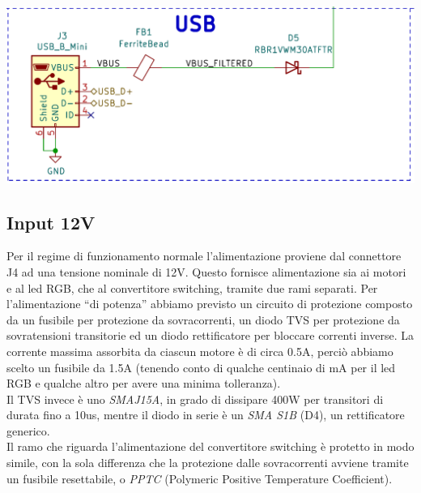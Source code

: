 \begin{center}
\includegraphics[scale=0.4]{figures/image60.png}
\captionsetup{type=figure}
\end{center}

\hypertarget{input-12V}{%
\subsection{\texorpdfstring{Input 12V}{Input 12V}}\label{input-12V}}

Per il regime di funzionamento normale l’alimentazione proviene dal connettore J4 ad una tensione nominale di 12V. 
Questo fornisce alimentazione sia ai motori e al led RGB, che al convertitore switching, tramite due rami separati.
Per l’alimentazione “di potenza” abbiamo previsto un circuito di protezione composto da un fusibile per protezione da sovracorrenti, 
un diodo TVS per protezione da sovratensioni transitorie ed un diodo rettificatore per bloccare correnti inverse. La corrente massima assorbita da 
ciascun motore è di circa 0.5A, perciò abbiamo scelto un fusibile da 1.5A (tenendo conto di qualche centinaio di mA per il led RGB 
e qualche altro per avere una minima tolleranza).\\
Il TVS invece è uno \emph{SMAJ15A}, in grado di dissipare 400W per transitori di durata fino a 10us, mentre il diodo in serie è un \textit{SMA S1B}
(D4), un rettificatore generico.\\
Il ramo che riguarda l’alimentazione del convertitore switching è protetto in modo simile, con la sola differenza che la protezione 
dalle sovracorrenti avviene tramite un fusibile resettabile, o \textit{PPTC} (Polymeric Positive Temperature Coefficient).

